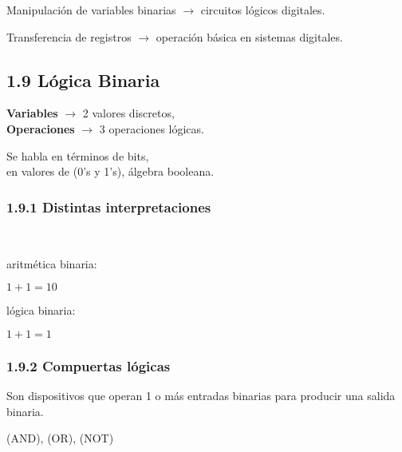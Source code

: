 Manipulaci\'{o}n de variables binarias $\rightarrow$ circuitos l\'{o}gicos digitales.
\medbreak

Transferencia de registros $\rightarrow$ operaci\'{o}n b\'{a}sica en sistemas digitales.
\medbreak

\subsection*{1.9 L\'{o}gica Binaria}
\begin{center}
    \textbf{Variables} $\rightarrow$ 2 valores discretos, \\
    \textbf{Operaciones} $\rightarrow$ 3 operaciones l\'{o}gicas.
\end{center}
\medbreak

\begin{flushleft}
    Se habla en t\'{e}rminos de bits, \\
    en valores de (0's y 1's), \'{a}lgebra booleana.
\end{flushleft}
\medbreak

\begin{center}
\end{center}

\subsubsection*{1.9.1 Distintas interpretaciones} \
\begin{flushleft}
    aritm\'{e}tica binaria: \\
    \begin{center}
        $1 + 1 = 10$
    \end{center}
    l\'{o}gica binaria: \\
    \begin{center}
        $1 + 1 = 1$
    \end{center}
\end{flushleft}

\subsubsection*{1.9.2 Compuertas l\'{o}gicas} Son dispositivos que operan 1 o
m\'{a}s entradas binarias para producir una salida binaria.

\begin{center}
    (AND), (OR), (NOT)
\end{center}
